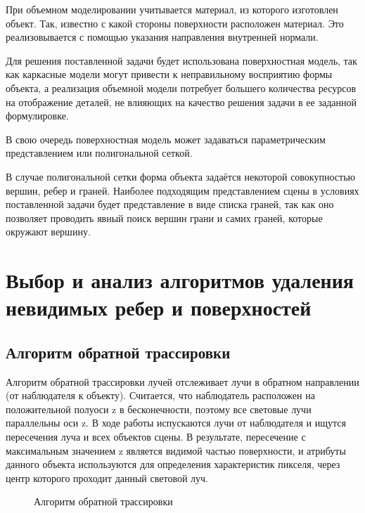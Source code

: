 При объемном моделировании учитывается материал, из которого изготовлен объект. Так, известно с какой стороны поверхности расположен материал. Это реализовывается с помощью указания направления внутренней нормали.

Для решения поставленной задачи будет использована поверхностная модель, так как каркасные модели могут привести к неправильному восприятию формы объекта, а реализация объемной модели потребует большего количества ресурсов на отображение деталей, не влияющих на качество решения задачи в ее заданной формулировке.

В свою очередь поверхностная модель может задаваться параметрическим представлением или полигональной сеткой.

В случае полигональной сетки форма объекта задаётся некоторой совокупностью вершин, ребер и граней. Наиболее подходящим представлением сцены в условиях поставленной задачи будет представление в виде списка граней, так как оно позволяет проводить явный поиск вершин грани и самих граней, которые окружают вершину.

\section{Выбор и анализ алгоритмов удаления невидимых ребер и поверхностей}

\subsection{Алгоритм обратной трассировки}

Алгоритм обратной трассировки лучей отслеживает лучи в обратном направлении (от наблюдателя к объекту). Считается, что наблюдатель расположен на положительной полуоси z в бесконечности, поэтому все световые лучи параллельны оси z. В ходе работы испускаются лучи от наблюдателя и ищутся пересечения луча и всех объектов сцены. В результате, пересечение с максимальным значением z является видимой частью поверхности, и атрибуты данного объекта используются для определения характеристик пикселя, через центр которого проходит данный световой луч. 

\begin{figure}[ph!]
	\caption{Алгоритм обратной трассировки}
	\label{fig:trace}
\end{figure}

